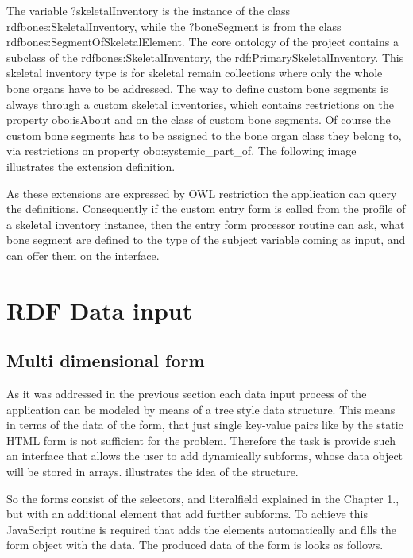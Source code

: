 
The variable ?skeletalInventory is the instance of the class rdfbones:SkeletalInventory, while the ?boneSegment is from the class rdfbones:SegmentOfSkeletalElement. The core ontology of the project contains a subclass of the rdfbones:SkeletalInventory, the rdf:PrimarySkeletalInventory. This skeletal inventory type is for skeletal remain collections where only the whole bone organs have to be addressed.  The way to define custom bone segments is always through a custom skeletal inventories, which contains restrictions on the property obo:isAbout and on the class of custom bone segments. Of course the custom bone segments has to be assigned to the bone organ class they belong to, via restrictions on property obo:systemic\_part\_of. The following image illustrates the extension definition.



As these extensions are expressed by OWL restriction the application can query the definitions. Consequently if the custom entry form is called from the profile of a skeletal inventory instance, then the entry form processor routine can ask, what bone segment are defined to the type of the subject variable coming as input, and can offer them on the interface.



\section{RDF Data input}

\subsection{Multi dimensional form}

As it was addressed in the previous section each data input process of the application can be modeled by means of a tree style data structure. This means in terms of the data of the form, that just single key-value pairs like by the static HTML form is not sufficient for the problem. Therefore the task is provide such an interface that allows the user to add dynamically subforms, whose data object will be stored in arrays.  illustrates the idea of the structure. 


So the forms consist of the selectors, and literalfield explained in the Chapter 1., but with an additional element that add further subforms. To achieve this JavaScript routine is required that adds the elements automatically and fills the form object with the data. The produced data of the form is looks as follows.



